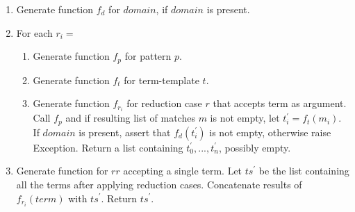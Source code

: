 \begin{enumerate}
\item Generate function $f_d$ for $domain$, if $domain$ is present.
\item For each $r_i= $ \ReductionCase
	\begin{enumerate}
	\item Generate function $f_p$ for pattern $p$.
	\item Generate function $f_t$ for term-template $t$.
	\item Generate function $f_{r_i}$ for reduction case $r$ that accepts term as argument. Call $f_p$ and if resulting list of matches $m$ is not empty, let $t_i^\prime=f_t(m_i)$. If $domain$ is present, assert that $f_d(t_i^\prime)$ is not empty, otherwise raise Exception. Return a list containing $t_0^\prime, ..., t_n^\prime$, possibly empty.
	\end{enumerate}
\item Generate function for $rr$ accepting a single term. Let $ts^\prime$ be the list containing all the terms after applying reduction cases. Concatenate results of $f_{r_i}(term)$ with $ts^\prime$. Return $ts^\prime$.
\end{enumerate}

